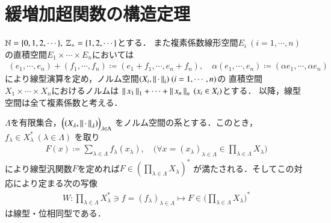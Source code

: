 \section{緩増加超関数の構造定理}
	$\mathbb{N} = \{0,1,2,\cdots\},\ \mathbb{Z}_+ = \{1,2,\cdots\}$とする．
	また複素係数線形空間$E_i\ (i=1,\cdots,n)$の直積空間$E_1 \times \cdots \times E_n$においては
	\begin{align}
		(e_1,\cdots,e_n) + (f_1,\cdots,f_n) \coloneqq (e_1 + f_1,\cdots,e_n + f_n), 
		\quad \alpha (e_1,\cdots,e_n) \coloneqq (\alpha e_1,\cdots,\alpha e_n)
	\end{align}
	により線型演算を定め，ノルム空間$(X_i,\left\|\, \cdot\, \right\|_{i})\ (i=1,\cdots,n)$の
	直積空間$X_1 \times \cdots \times X_n$におけるノルムは
	$\left\|\, x_1\, \right\|_{1} + \cdots + \left\|\, x_n\, \right\|_{n}\ (x_i \in X_i)$とする．
	以降，線型空間は全て複素係数と考える．
	\begin{screen}
		\begin{lem}\label{lem:isomorphism_on_product_of_dual_spaces}
			$\Lambda$を有限集合，$\Bigl( (X_\lambda,\left\|\, \cdot\, \right\|_{\lambda}) \Bigr)_{\lambda \in \Lambda}$
			をノルム空間の系とする．このとき，$f_\lambda \in X^*_\lambda\ (\lambda \in \Lambda)$
			を取り
			\begin{align}
				F(x) \coloneqq \sum_{\lambda \in \Lambda} f_\lambda(x_\lambda),
				\quad \biggl(\forall x = (x_\lambda)_{\lambda \in \Lambda} \in \prod_{\lambda \in \Lambda} X_\lambda \biggr)
				\label{eq:lem_isomorphism_on_product_of_dual_spaces}
			\end{align}
			により線型汎関数$F$を定めれば$F \in \left( \prod_{\lambda \in \Lambda} X_\lambda \right)^*$
			が満たされる．そしてこの対応により定まる次の写像
			\begin{align}
				W:\prod_{\lambda \in \Lambda} X_\lambda^* \ni f = (f_\lambda)_{\lambda \in \Lambda}
				\longmapsto F \in \Biggl( \prod_{\lambda \in \Lambda} X_\lambda \Biggr)^*
			\end{align}
			は線型・位相同型である．
		\end{lem}
	\end{screen}
	
